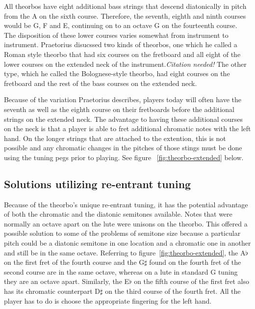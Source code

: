All theorbos have eight additional bass strings that descend diatonically in pitch from
the A on the sixth course.  Therefore, the seventh, eighth and ninth courses would be G, F
and E, continuing on to an octave G on the fourteenth course.  The disposition of these
lower courses varies somewhat from instrument to instrument.  Praetorius disucssed two
kinds of theorbos, one which he called a Roman style theorbo that had six courses on the
fretboard and all eight of the lower courses on the extended neck of the
instrument.\textit{Citation needed!} The other type, which he called the Bolognese-style
theorbo, had eight courses on the fretboard and the rest of the bass courses on the
extended neck.

Because of the variation Praetorius describes, players today will often have the seventh
as well as the eighth course on their fretboards before the additional strings on the
extended neck.  The advantage to having these additional courses on the neck is that a
player is able to fret additional chromatic notes with the left hand.  On the longer
strings that are attached to the extention, this is not possible and any chromatic changes
in the pitches of those stings must be done using the tuning pegs prior to playing. See
figure ~\ref{fig:theorbo-extended} below.


\subsection{Solutions utilizing re-entrant tuning}

Because of the theorbo's unique re-entrant tuning, it has the potential advantage of both
the chromatic and the diatonic semitones available.  Notes that were normally an octave
apart on the lute were unisons on the theorbo.  This offered a possible solution to some
of the problems of semitone size because a particular pitch could be a diatonic semitone
in one location and a chromatic one in another and still be in the same octave. Referring
to figure~\ref{fig:theorbo-extended}, the A$\flat$ on the first fret of the fourth course
and the G$\sharp$ found on the fourth fret of the second course are in the same octave,
whereas on a lute in standard G tuning they are an octave apart. Similarly, the E$\flat$
on the fifth course of the first fret also has its chromatic counterpart D$\sharp$ on the
third course of the fourth fret.  All the player has to do is choose the appropriate
fingering for the left hand.

